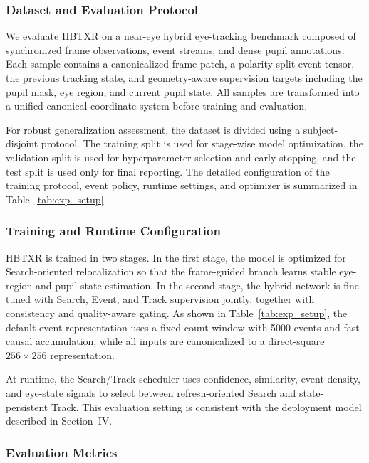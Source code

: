 ﻿\documentclass[journal]{IEEEtran}
\begin{document}
\subsubsection{Dataset and Evaluation Protocol}

We evaluate HBTXR on a near-eye hybrid eye-tracking benchmark composed of synchronized frame observations, event streams, and dense pupil annotations. Each sample contains a canonicalized frame patch, a polarity-split event tensor, the previous tracking state, and geometry-aware supervision targets including the pupil mask, eye region, and current pupil state. All samples are transformed into a unified canonical coordinate system before training and evaluation.

For robust generalization assessment, the dataset is divided using a subject-disjoint protocol. The training split is used for stage-wise model optimization, the validation split is used for hyperparameter selection and early stopping, and the test split is used only for final reporting. The detailed configuration of the training protocol, event policy, runtime settings, and optimizer is summarized in Table~\ref{tab:exp_setup}.

\subsubsection{Training and Runtime Configuration}

HBTXR is trained in two stages. In the first stage, the model is optimized for Search-oriented relocalization so that the frame-guided branch learns stable eye-region and pupil-state estimation. In the second stage, the hybrid network is fine-tuned with Search, Event, and Track supervision jointly, together with consistency and quality-aware gating. As shown in Table~\ref{tab:exp_setup}, the default event representation uses a fixed-count window with 5000 events and fast causal accumulation, while all inputs are canonicalized to a direct-square \(256 \times 256\) representation.

At runtime, the Search/Track scheduler uses confidence, similarity, event-density, and eye-state signals to select between refresh-oriented Search and state-persistent Track. This evaluation setting is consistent with the deployment model described in Section~IV.

\subsubsection{Evaluation Metrics}
\end{document}
